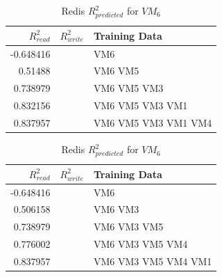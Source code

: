 \documentclass{acm_proc_article-sp}
\begin{document}



\begin{table}
\centering
\caption{Redis $R_{predicted}^2$ for $VM_6$}
\begin{tabular}{|r|r|l|} \hline
$R_{read}^2$&$R_{write}^2$&Training Data\\ \hline
-0.648416 &   & VM6 \\ \hline 
0.51488 &   & VM6 VM5 \\ \hline 
0.738979 &   & VM6 VM5 VM3 \\ \hline 
0.832156 &   & VM6 VM5 VM3 VM1 \\ \hline 
0.837957 &   & VM6 VM5 VM3 VM1 VM4 \\ \hline 
\hline\end{tabular}
\label{table:redis}
\end{table}

\begin{table}
\centering
\caption{Redis $R_{predicted}^2$ for $VM_6$}
\begin{tabular}{|r|r|l|} \hline
$R_{read}^2$&$R_{write}^2$&Training Data\\ \hline
-0.648416 &   & VM6 \\ \hline 
0.506158 &   & VM6 VM3 \\ \hline 
0.738979 &   & VM6 VM3 VM5 \\ \hline 
0.776002 &   & VM6 VM3 VM5 VM4 \\ \hline 
0.837957 &   & VM6 VM3 VM5 VM4 VM1 \\ \hline 
\hline\end{tabular}
\label{table:redis}
\end{table}
\end{document}
